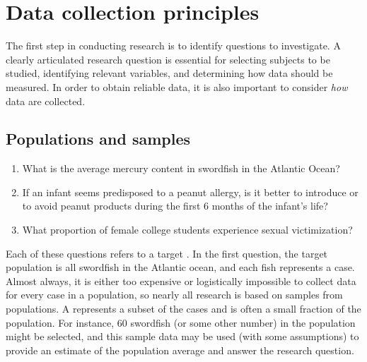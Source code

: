 \begin{doublespace}
\begin{exercise}
\end{exercise}

\section{Data collection principles}
\label{dataCollectionPrinciples}


The first step in conducting research is to identify questions to investigate. A clearly articulated research question is essential for selecting subjects to be studied, identifying relevant variables, and determining how data should be measured. In order to obtain reliable data, it is also important to consider \textit{how} data are collected.

\subsection{Populations and samples}
\label{populationsAndSamples}

\begin{enumerate}
\setlength{\itemsep}{0mm}

\item What is the average mercury content in swordfish in the Atlantic Ocean?

\item If an infant seems predisposed to a peanut allergy, is it better to introduce or to avoid peanut products during the first 6 months of the infant's life?

\item What proportion of female college students experience sexual victimization?

\end{enumerate}

Each of these questions refers to a target . In the first question, the target population is all swordfish in the Atlantic ocean, and each fish represents a case. Almost always, it is either too expensive or logistically impossible to collect data for every case in a population, so nearly all research is based on samples from populations. A  represents a subset of the cases and is often a small fraction of the population. For instance, 60 swordfish (or some other number) in the population might be selected, and this sample data may be used (with some assumptions) to provide an estimate of the population average and answer the research question.


\end{doublespace}
